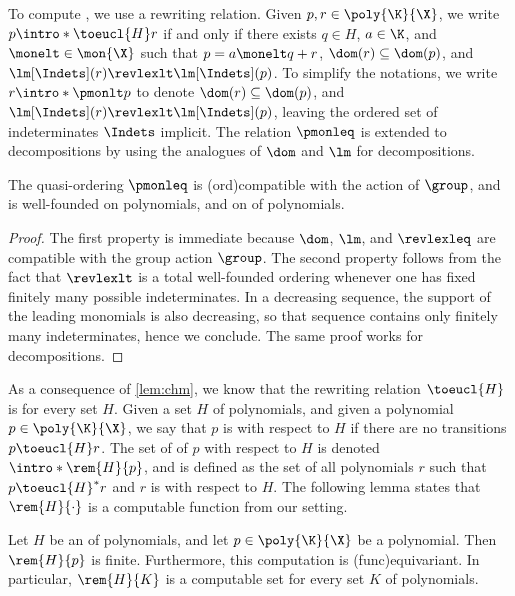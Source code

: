 \AP To compute , we use a rewriting
relation. Given $p,r \in \poly{\K}{\X}$, we write $p \intro*\toeucl{H}
r$ if and only if there exists $q \in H$, $a \in \K$, and $\monelt \in
\mon{\X}$ such that $p = a \monelt q + r$, $\dom(r) \subseteq \dom(p)$, and
$\lm[\Indets](r) \revlexlt \lm[\Indets](p)$. To simplify the
notations, we write $r \intro*\pmonlt p$ to denote $\dom(r) \subseteq
\dom(p)$, and $\lm[\Indets](r) \revlexlt \lm[\Indets](p)$, leaving the
ordered set of indeterminates $\Indets$ implicit.
The relation $\pmonleq$ is extended to decompositions by using 
the analogues of $\dom$ and $\lm$ for decompositions.

\begin{lemma}
  \label{lem:chm}
  The quasi-ordering $\pmonleq$ is \kl(ord){compatible} with the action of $\group$,
  and is well-founded on polynomials, and on  of polynomials.
\end{lemma}
\begin{proof}
  The first property is immediate because $\dom$, $\lm$, and $\revlexleq$ are
  compatible with the group action $\group$. 
  The second property follows from the fact that $\revlexlt$ is a total
  well-founded ordering whenever one has fixed finitely many possible 
  indeterminates. In a decreasing sequence, the support of the leading 
  monomials is also decreasing, so that sequence contains only finitely many 
  indeterminates, hence we conclude.
  The same proof works for decompositions.
\end{proof}

\AP As a consequence of \cref{lem:chm}, we know that the rewriting relation
$\toeucl{H}$ is  for every set $H$. Given a set $H$ of
polynomials, and given a polynomial $p \in \poly{\K}{\X}$, we say that $p$ is
 with respect to $H$ if there are no transitions $p
\toeucl{H} r$. The set of  of $p$ with respect to $H$ is
denoted $\intro*\rem{H}{p}$, and is defined as the set of all polynomials $r$
such that $p \toeucl{H}^* r$ and $r$ is  with respect to $H$.
The following lemma states that $\rem{H}{\cdot}$ is a computable function from
our setting.


\begin{lemma}[name={},restate={lem:normalisation}]
  \label{lem:normalisation}
  Let $H$ be an  of polynomials, and let $p \in \poly{\K}{\X}$ be a
  polynomial. Then $\rem{H}{p}$ is finite.
  Furthermore, this computation
  is \kl(func){equivariant}. In particular, 
  $\rem{H}{K}$ is a computable  set 
  for every  set $K$ of polynomials.
\end{lemma}


